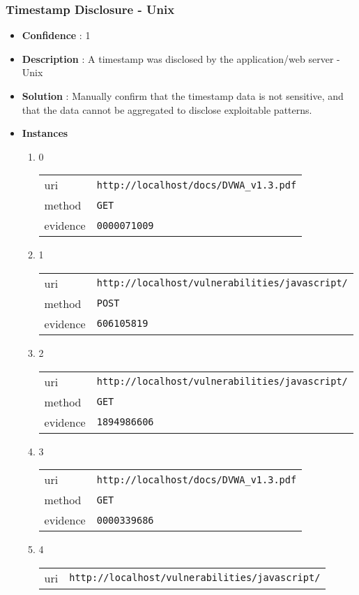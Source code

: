 \documentclass[10pt]{article}
\begin{document}
\subsubsection{Timestamp Disclosure - Unix}
\begin{itemize}
\item[] \textbf{Confidence} : 1
\item[] \textbf{Description} : A timestamp was disclosed by the application/web server - Unix
\item[] \textbf{Solution} :  Manually confirm that the timestamp data is not sensitive, and that the data cannot be aggregated to disclose exploitable patterns.
\item[] \textbf{Instances}
\begin{enumerate}
\item[] 0
\begin{tabular}{| l | p{12cm}}
uri & \texttt{http://localhost/docs/DVWA\_v1.3.pdf} \\
method & \texttt{GET} \\
evidence & \texttt{0000071009} \\
\end{tabular}
\item[] 1
\begin{tabular}{| l | p{12cm}}
uri & \texttt{http://localhost/vulnerabilities/javascript/} \\
method & \texttt{POST} \\
evidence & \texttt{606105819} \\
\end{tabular}
\item[] 2
\begin{tabular}{| l | p{12cm}}
uri & \texttt{http://localhost/vulnerabilities/javascript/} \\
method & \texttt{GET} \\
evidence & \texttt{1894986606} \\
\end{tabular}
\item[] 3
\begin{tabular}{| l | p{12cm}}
uri & \texttt{http://localhost/docs/DVWA\_v1.3.pdf} \\
method & \texttt{GET} \\
evidence & \texttt{0000339686} \\
\end{tabular}
\item[] 4
\begin{tabular}{| l | p{12cm}}
uri & \texttt{http://localhost/vulnerabilities/javascript/} \\

\end{tabular}
\end{enumerate}
\end{itemize}
\end{document}
